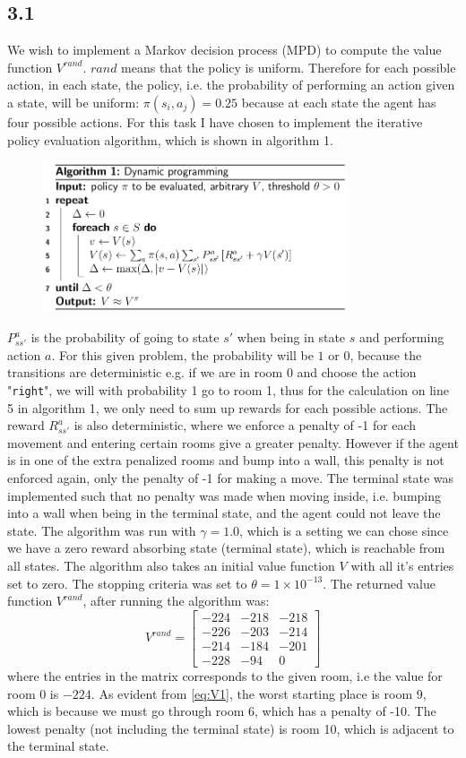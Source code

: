 \documentclass{article}
\begin{document}
\subsection{3.1}
We wish to implement a Markov decision process (MPD) to compute the value function $V^{rand}$. $rand$ means that the policy is uniform. Therefore for each possible action, in each state, the policy, i.e. the probability of performing an action given a state, will be uniform: $\pi(s_i,a_j) = 0.25$ because at each state the agent has four possible actions. For this task I have chosen to implement the iterative policy evaluation algorithm, which is shown in algorithm 1. 
\begin{figure}[H]
  \includegraphics[width=9cm]{fig/1.png}
\end{figure}
$P^a_{ss'}$ is the probability of going to state $s'$ when being in state $s$ and performing action $a$. For this given problem, the probability will be $1$ or $0$, because the transitions are deterministic e.g. if we are in room 0 and choose the action "\texttt{right}", we will with probability 1 go to room 1, thus for the calculation on line 5 in algorithm 1, we only need to sum up rewards for each possible actions. The reward $R^a_{ss'}$ is also deterministic, where we enforce a penalty of -1 for each movement and entering certain rooms give a greater penalty. However if the agent is in one of the extra penalized rooms and bump into a wall, this penalty is not enforced again, only the penalty of -1 for making a move. The terminal state was implemented such that no penalty was made when moving inside, i.e. bumping into a wall when being in the terminal state, and the agent could not leave the state. The algorithm was run with $\gamma =1.0$, which is a setting we can chose since we have a zero reward absorbing state (terminal state), which is reachable from all states. The algorithm also takes an initial value function $V$ with all it's entries set to zero. The stopping criteria was set to $\theta = 1 \times 10^{-13}$. The returned value function $V^{rand}$, after running the algorithm was:
\begin{equation}
\label{eq:V1}
V^{rand} = \begin{bmatrix}
-224 & -218 & -218 \\
-226 & -203 & -214 \\
-214 & -184 & -201 \\
-228 & -94 & 0
\end{bmatrix}
\end{equation}
where the entries in the matrix corresponds to the given room, i.e the value for room 0 is $-224$. As evident from \eqref{eq:V1}, the worst starting place is room 9, which is because we must go through room 6, which has a penalty of -10. The lowest penalty (not including the terminal state) is room 10, which is adjacent to the terminal state.
\end{document}
